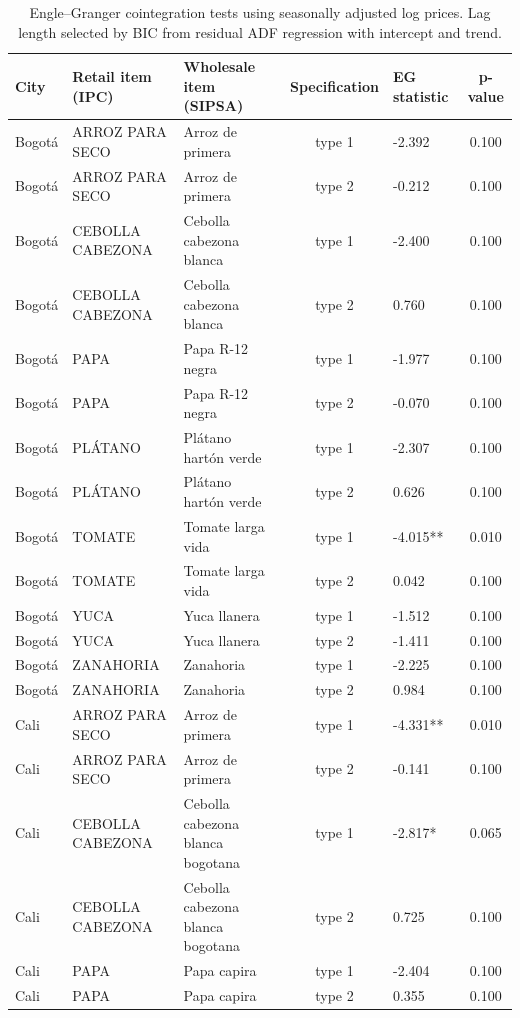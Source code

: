 \documentclass[
  12pt,
]{article}
\begin{document}
\begin{longtable}[t]{lllclc}
\caption{\label{tab:coint-eg-q1-tables}Engle–Granger cointegration tests using seasonally adjusted log prices. Lag length selected by BIC from residual ADF regression with intercept and trend.}\\
\toprule
City & Retail item (IPC) & Wholesale item (SIPSA) & Specification & EG statistic & p-value\\
\midrule
Bogotá & ARROZ PARA SECO & Arroz de primera & type 1 & -2.392 & 0.100\\
Bogotá & ARROZ PARA SECO & Arroz de primera & type 2 & -0.212 & 0.100\\
Bogotá & CEBOLLA CABEZONA & Cebolla cabezona blanca & type 1 & -2.400 & 0.100\\
Bogotá & CEBOLLA CABEZONA & Cebolla cabezona blanca & type 2 & 0.760 & 0.100\\
Bogotá & PAPA & Papa R-12 negra & type 1 & -1.977 & 0.100\\
\addlinespace
Bogotá & PAPA & Papa R-12 negra & type 2 & -0.070 & 0.100\\
Bogotá & PLÁTANO & Plátano hartón verde & type 1 & -2.307 & 0.100\\
Bogotá & PLÁTANO & Plátano hartón verde & type 2 & 0.626 & 0.100\\
Bogotá & TOMATE & Tomate larga vida & type 1 & -4.015** & 0.010\\
Bogotá & TOMATE & Tomate larga vida & type 2 & 0.042 & 0.100\\
\addlinespace
Bogotá & YUCA & Yuca llanera & type 1 & -1.512 & 0.100\\
Bogotá & YUCA & Yuca llanera & type 2 & -1.411 & 0.100\\
Bogotá & ZANAHORIA & Zanahoria & type 1 & -2.225 & 0.100\\
Bogotá & ZANAHORIA & Zanahoria & type 2 & 0.984 & 0.100\\
Cali & ARROZ PARA SECO & Arroz de primera & type 1 & -4.331** & 0.010\\
\addlinespace
Cali & ARROZ PARA SECO & Arroz de primera & type 2 & -0.141 & 0.100\\
Cali & CEBOLLA CABEZONA & Cebolla cabezona blanca bogotana & type 1 & -2.817* & 0.065\\
Cali & CEBOLLA CABEZONA & Cebolla cabezona blanca bogotana & type 2 & 0.725 & 0.100\\
Cali & PAPA & Papa capira & type 1 & -2.404 & 0.100\\
Cali & PAPA & Papa capira & type 2 & 0.355 & 0.100\\

\end{longtable}
\end{document}
